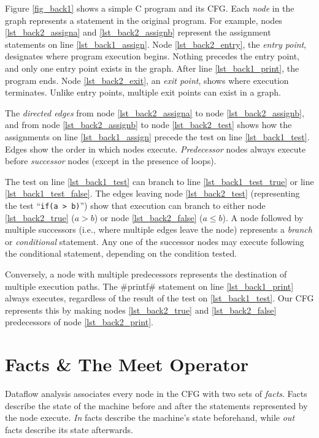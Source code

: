 \documentclass[12pt]{report}
\begin{document}
Figure \ref{fig_back1} shows a simple C program and its CFG. Each
\emph{node} in the graph represents a statement in the original
program. For example, nodes \ref{lst_back2_assigna} and
\ref{lst_back2_assignb} represent the assignment statements on line
\ref{lst_back1_assign}. Node \ref{lst_back2_entry}, the \emph{entry
  point}, designates where program execution begins. Nothing precedes
the entry point, and only one entry point exists in the graph. After
line \ref{lst_back1_print}, the program ends. Node
\ref{lst_back2_exit}, an \emph{exit point}, shows where execution
terminates. Unlike entry points, multiple exit points can exist in a
graph.

The \emph{directed edges} from node \ref{lst_back2_assigna} to node
\ref{lst_back2_assignb}, and from node \ref{lst_back2_assignb} to node
\ref{lst_back2_test} shows how the assignments on line
\ref{lst_back1_assign} precede the test on line
\ref{lst_back1_test}. Edges show the order in which nodes
execute. \emph{Predecessor} nodes always execute before
\emph{successor} nodes (except in the presence of loops).

The test on line \ref{lst_back1_test} can branch to line
\ref{lst_back1_test_true} or line \ref{lst_back1_test_false}. The
edges leaving node \ref{lst_back2_test} (representing the test
``\verb=if(a > b)='') show that execution can branch to either node
\ref{lst_back2_true} ($a > b$) or node \ref{lst_back2_false} ($a \leq
b$). A node followed by multiple successors (i.e., where multiple
edges leave the node) represents a \emph{branch} or \emph{conditional}
statement. Any one of the successor nodes may execute following the
conditional statement, depending on the condition tested.

Conversely, a node with multiple predecessors represents the
destination of multiple execution paths. The #printf# statement on
line \ref{lst_back1_print} always executes, regardless of the result
of the test on \ref{lst_back1_test}. Our CFG represents this by making
nodes \ref{lst_back2_true} and \ref{lst_back2_false} predecessors of
node \ref{lst_back2_print}.

\section{Facts \& The Meet Operator}
Dataflow analysis associates every node in the CFG with two sets of
\emph{facts}. Facts describe the state of the machine before and after
the statements represented by the node execute. \emph{In} facts describe
the machine's state beforehand, while \emph{out} facts describe its state
afterwards. 
\end{document}
